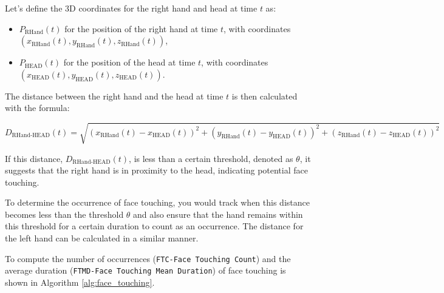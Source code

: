 Let's define the 3D coordinates for the right hand and head at time $t$ as:
\begin{itemize}
\item $P_{\text{RHand}}(t)$ for the position of the right hand at time $t$, with coordinates $(x_{\text{RHand}}(t), y_{\text{RHand}}(t), z_{\text{RHand}}(t))$,
\item $P_{\text{HEAD}}(t)$ for the position of the head at time $t$, with coordinates $(x_{\text{HEAD}}(t), y_{\text{HEAD}}(t), z_{\text{HEAD}}(t))$.
\end{itemize}

The distance between the right hand and the head at time $t$ is then calculated with the formula:

\begin{equation}
D_{\text{RHand-HEAD}}(t) = \sqrt{(x_{\text{RHand}}(t) - x_{\text{HEAD}}(t))^2 + (y_{\text{RHand}}(t) - y_{\text{HEAD}}(t))^2 + (z_{\text{RHand}}(t) - z_{\text{HEAD}}(t))^2}
\end{equation}

If this distance, $D_{\text{RHand-HEAD}}(t)$, is less than a certain threshold, denoted as $\theta$, it suggests that the right hand is in proximity to the head, indicating potential face touching.

To determine the occurrence of face touching, you would track when this distance becomes less than the threshold $\theta$ and also ensure that the hand remains within this threshold for a certain duration to count as an occurrence. The distance for the left hand can be calculated in a similar manner.

To compute the number of occurrences (\texttt{FTC-Face Touching Count}) and the average duration (\texttt{FTMD-Face Touching Mean Duration}) of face touching is shown in Algorithm \ref{alg:face_touching}.

